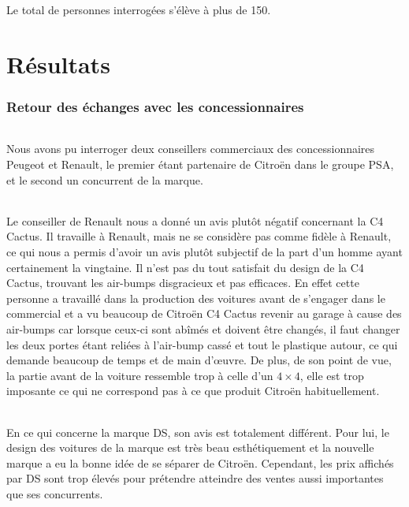 \documentclass[12pt]{article}\usepackage[]{graphicx}\usepackage[]{color}
\begin{document}
\noindent Le total de personnes interrogées s'élève à plus de 150.

\part{Résultats}

\section{Retour des échanges avec les concessionnaires}

\paragraph{} Nous avons pu interroger deux conseillers commerciaux des
concessionnaires Peugeot et Renault, le premier étant partenaire de Citroën dans
le groupe PSA, et le second un concurrent de la marque.

\paragraph{} Le conseiller de Renault nous a donné un avis plutôt négatif
concernant la C4 Cactus. Il travaille à Renault, mais ne se considère pas comme
fidèle à Renault, ce qui nous a permis d'avoir un avis plutôt subjectif de la
part d'un homme ayant certainement la vingtaine. Il n'est pas du tout satisfait
du design de la C4 Cactus, trouvant les air-bumps disgracieux et pas efficaces.
En effet cette personne a travaillé dans la production des voitures avant de
s'engager dans le commercial et a vu beaucoup de Citroën C4 Cactus revenir au
garage à cause des air-bumps car lorsque ceux-ci sont abîmés et doivent être
changés, il faut changer les deux portes étant reliées à l'air-bump cassé et
tout le plastique autour, ce qui demande beaucoup de temps et de main d'œuvre.
De plus, de son point de vue, la partie avant de la voiture ressemble trop à
celle d'un $4 \times 4$, elle est trop imposante ce qui ne correspond pas à ce que
produit Citroën habituellement.

\paragraph{} En ce qui concerne la marque DS, son avis est totalement
différent. Pour lui, le design des voitures de la marque est très beau
esthétiquement et la nouvelle marque a eu la bonne idée de se séparer de
Citroën. Cependant, les prix affichés par DS sont trop élevés pour prétendre
atteindre des ventes aussi importantes que ses concurrents.
\end{document}
